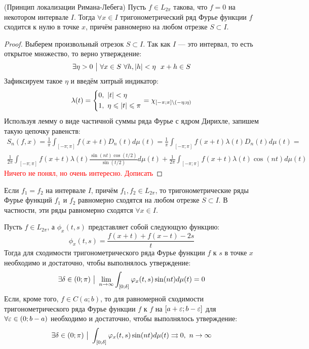 \begin{theorem} (Принцип локализации Римана-Лебега)
	Пусть $f \in L_{2\pi}$ такова, что $f = 0$ на некотором интервале $I$. Тогда $\forall x \in I$ тригонометрический ряд Фурье функции $f$ сходится к нулю в точке $x$, причём равномерно на любом отрезке $S \subset I$.
\end{theorem}

\begin{proof}
	Выберем произвольный отрезок $S \subset I$. Так как $I$ --- это интервал, то есть открытое множество, то верно утверждение:
	\[
		\exists \eta > 0 \such \forall x \in S\ \forall h, |h| < \eta\ \ x + h \in S
	\]
	Зафиксируем такое $\eta$ и введём хитрый индикатор:
	\[
		\lambda(t) = \left\{ \begin{aligned} 
			&{0,\ |t| < \eta}
			\\
			&{1,\ \eta \leqslant |t| \leqslant \pi}
		 \end{aligned} \right.
		= \chi_{[-\pi; \pi] \backslash (-\eta; \eta)}
	\]
	Используя лемму о виде частичной суммы ряда Фурье с ядром Дирихле, запишем такую цепочку равенств:
	\begin{multline*}
		S_n(f, x) = \frac{1}{\pi} \int_{[-\pi; \pi]} f(x + t)D_n(t)d\mu(t) = \frac{1}{\pi} \int_{[-\pi; \pi]} f(x + t)\lambda(t)D_n(t)d\mu(t) =
		\\
		\frac{1}{2\pi} \int_{[-\pi; \pi]} f(x + t)\lambda(t) \frac{\sin(nt)\cos(t / 2)}{\sin(t / 2)}d\mu(t) + \frac{1}{2\pi} \int_{[-\pi; \pi]} f(x + t)\lambda(t)\cos(nt)d\mu(t)
	\end{multline*}
	\textcolor{red}{Ничего не понял, но очень интересно. Дописать}
\end{proof}

\begin{corollary}
	Если $f_1 = f_2$ на интервале $I$, причём $f_1, f_2 \in L_{2\pi}$, то тригонометрические ряды Фурье функций $f_1$ и $f_2$ равномерно сходятся на любом отрезке $S \subset I$. В частности, эти ряды равномерно сходятся $\forall x \in I$.
\end{corollary}

\begin{lemma}
	Пусть $f \in L_{2\pi}$, а $\phi_x(t, s)$ представляет собой следующую функцию:
	\[
		\phi_x(t, s) = \frac{f(x + t) + f(x - t) - 2s}{t}
	\]
	Тогда для сходимости тригонометрического ряда Фурье функции $f$ к $s$ в точке $x$ необходимо и достаточно, чтобы выполнялось утверждение:
	\[
		\exists \delta \in (0; \pi) \ \big|\  \lim_{n \to \infty} \int_{[0; \delta]} \varphi_x(t, s)\sin(nt)d\mu(t) = 0
	\]
	Если, кроме того, $f \in C(a; b)$, то для равномерной сходимости тригонометрического ряда Фурье функции $f$ к $f$ на $[a + \varepsilon; b - \varepsilon]$ для $\forall \varepsilon \in (0; b - a)$ необходимо и достаточно, чтобы выполнялось утверждение:
	\[
		\exists \delta \in (0; \pi) \ \big|\  \int_{[0; \delta]} \varphi_x(t, s)\sin(nt)d\mu(t) \rightrightarrows 0,\ n \to \infty
	\]
\end{lemma}